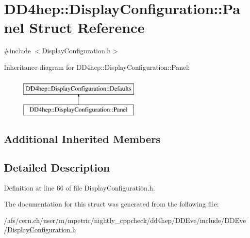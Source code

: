 \hypertarget{struct_d_d4hep_1_1_display_configuration_1_1_panel}{}\section{D\+D4hep\+:\+:Display\+Configuration\+:\+:Panel Struct Reference}
\label{struct_d_d4hep_1_1_display_configuration_1_1_panel}


{\ttfamily \#include $<$Display\+Configuration.\+h$>$}

Inheritance diagram for D\+D4hep\+:\+:Display\+Configuration\+:\+:Panel\+:\begin{figure}[H]
\begin{center}
\leavevmode
\includegraphics[height=2.000000cm]{struct_d_d4hep_1_1_display_configuration_1_1_panel}
\end{center}
\end{figure}
\subsection*{Additional Inherited Members}


\subsection{Detailed Description}


Definition at line 66 of file Display\+Configuration.\+h.



The documentation for this struct was generated from the following file\+:\begin{DoxyCompactItemize}
\item 
/afs/cern.\+ch/user/m/mpetric/nightly\+\_\+cppcheck/dd4hep/\+D\+D\+Eve/include/\+D\+D\+Eve/\hyperlink{_display_configuration_8h}{Display\+Configuration.\+h}\end{DoxyCompactItemize}
